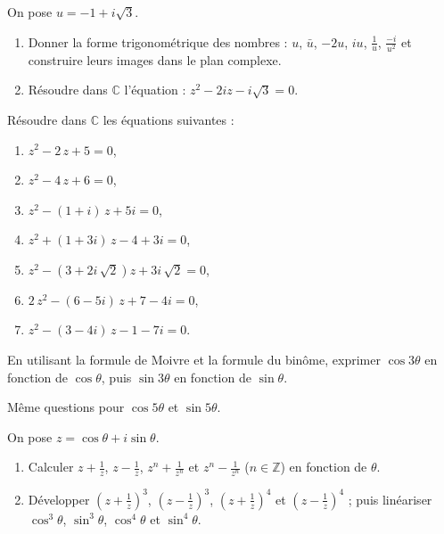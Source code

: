 %
\begin{exo}
      On pose $u=-1 + i \sqrt{3}$.
      \begin{enumerate}
            \item Donner la forme trigonom\'etrique des nombres :
                  $u$, $\bar{u}$, $-2u$, $iu$, $\frac{1}{u}$, $\frac{-i}{u^2}$
                  et construire leurs images dans le plan complexe.
            \item R\'esoudre dans $\mathbb{C}$ l'\'equation : $z^2 - 2i z - i\sqrt{3} = 0$.
      \end{enumerate}
\end{exo}
%
\begin{exo}
      R\'esoudre dans $\mathbb{C}$ les \'equations suivantes : 
      \begin{enumerate}
            \item $z^{2} - 2 \, z + 5 = 0$,
            \item $z^{2} - 4 \, z + 6 = 0$,
            \item $z^{2} - \left(1 + i\right) \, z + 5 i = 0$,
            \item $z^{2} + \left(1 + 3 i\right) \, z - 4 + 3 i = 0$,
            \item $z^{2} - ( 3 +  2 i \, \sqrt{2} )z + 3 i \, \sqrt{2} = 0$,
            \item $2 \, z^{2} - \left(6 - 5i\right) \, z + 7 - 4 i = 0$,
            \item $z^{2} - \left(3 - 4 i\right) \, z - 1 - 7 i = 0$.
      \end{enumerate}
\end{exo}
%
\begin{exo}
      En utilisant la formule de Moivre et la formule du bin\^ome, exprimer $\cos 3\theta$ en fonction de $\cos \theta$,
      puis $\sin 3\theta$ en fonction de $\sin \theta$.
      
      M\^eme questions pour $\cos 5\theta$ et $\sin 5\theta$.
\end{exo}
%
\begin{exo}
      On pose $z = \cos \theta + i \sin \theta$.
      \begin{enumerate}
            \item Calculer $z + \frac{1}{z}$, $z - \frac{1}{z}$, 
                  $z^n + \frac{1}{z^n}$ et $z^n - \frac{1}{z^n}$ ($n\in\mathbb{Z}$)
                  en fonction de $\theta$.
            \item D\'evelopper 
                  $\left( z + \frac{1}{z} \right)^3$,
                  $\left( z - \frac{1}{z} \right)^3$,
                  $\left( z + \frac{1}{z} \right)^4$ et
                  $\left( z - \frac{1}{z} \right)^4$ ; 
                  puis lin\'eariser $\cos^3 \theta$, $\sin^3 \theta$, $\cos^4 \theta$ et $\sin^4 \theta$.
      \end{enumerate}
\end{exo}
